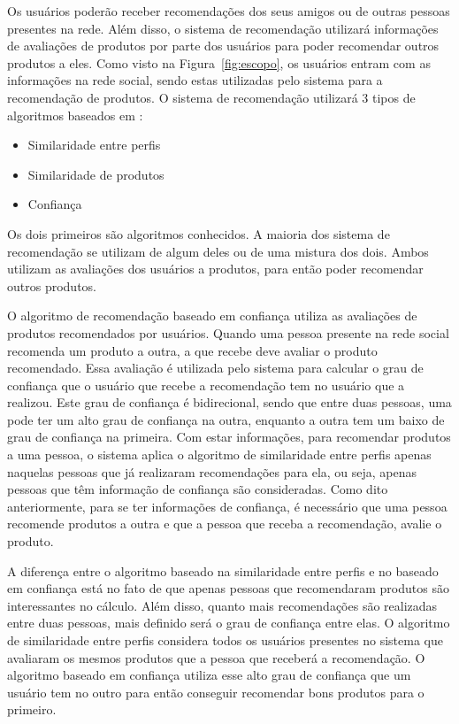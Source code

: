 Os usuários poderão receber recomendações dos seus amigos ou de outras pessoas presentes na rede. Além disso, o sistema de recomendação utilizará informações de avaliações de produtos por parte dos usuários para poder recomendar outros produtos a eles. Como visto na Figura~\ref{fig:escopo}, os usuários entram com as informações na rede social, sendo estas utilizadas pelo sistema para a recomendação de produtos. O sistema de recomendação utilizará 3 tipos de algoritmos baseados em :

\begin{itemize}
	\item Similaridade entre perfis
	\item Similaridade de produtos
	\item Confiança
\end{itemize}

 Os dois primeiros são algoritmos conhecidos. A maioria dos sistema de recomendação se utilizam de algum deles ou de uma mistura dos dois. Ambos utilizam as avaliações dos usuários a produtos, para então poder recomendar outros produtos.

 O algoritmo de recomendação baseado em confiança utiliza as avaliações de produtos recomendados por usuários. Quando uma pessoa presente na rede social recomenda um produto a outra, a que recebe deve avaliar o produto recomendado. Essa avaliação é utilizada pelo sistema para calcular o grau de confiança que o usuário que recebe a recomendação tem no usuário que a realizou. Este grau de confiança é bidirecional, sendo que entre duas pessoas, uma pode ter um alto grau de confiança na outra, enquanto a outra tem um baixo de grau de confiança na primeira. Com estar informações, para recomendar produtos a uma pessoa, o sistema aplica o algoritmo de similaridade entre perfis apenas naquelas pessoas que já realizaram recomendações para ela, ou seja, apenas pessoas que têm informação de confiança são consideradas. Como dito anteriormente, para se ter informações de confiança, é necessário que uma pessoa recomende produtos a outra e que a pessoa que receba a recomendação, avalie o produto.
 
 A diferença entre o algoritmo baseado na similaridade entre perfis e no baseado em confiança está no fato de que apenas pessoas que recomendaram produtos são interessantes no cálculo. Além disso, quanto mais recomendações são realizadas entre duas pessoas, mais definido será o grau de confiança entre elas. O algoritmo de similaridade entre perfis considera todos os usuários presentes no sistema que avaliaram os mesmos produtos que a pessoa que receberá a recomendação. O algoritmo baseado em confiança utiliza esse alto grau de confiança que um usuário tem no outro para então conseguir recomendar bons produtos para o primeiro.

